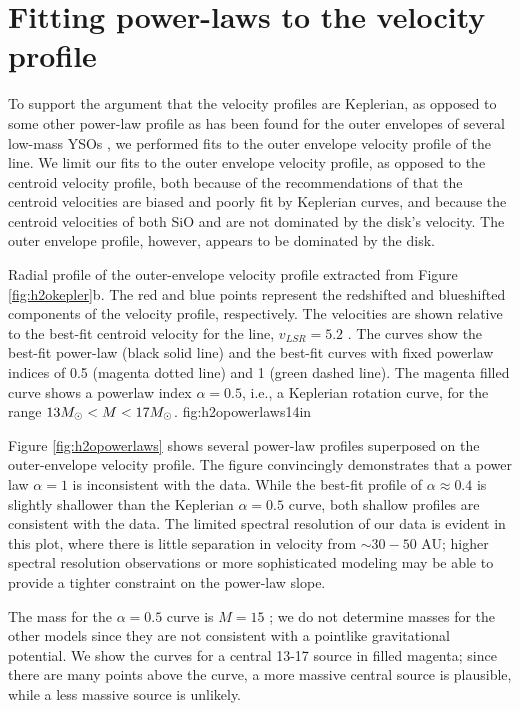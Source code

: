 \documentclass[twocolumn]{aastex61}
\begin{document}
\section{Fitting power-laws to the velocity profile}
To support the argument that the velocity profiles are Keplerian, as opposed to
some other power-law profile as has been found for the outer envelopes of
several low-mass YSOs
\citep{Lee2017h,Aso2017b,Ohashi2014a,Lindberg2014a,Murillo2013a}, we performed
fits to the outer envelope velocity profile of the \water line.  We limit our
fits to the outer envelope velocity profile, as opposed to the centroid
velocity profile, both because of the recommendations of \citet{Seifried2016a}
that the centroid velocities are biased and poorly fit by Keplerian curves, and
because the centroid velocities of both SiO and \water are not dominated by the
disk's velocity.  The outer envelope profile, however, appears to be dominated
by the disk.

{Radial profile of the outer-envelope velocity profile extracted from
Figure \ref{fig:h2okepler}b.  The red and blue points represent the redshifted
and blueshifted components of the velocity profile, respectively.  The velocities
are shown relative to the best-fit centroid velocity for the \water line,
$v_{LSR}=5.2$ \kms.  The curves show the best-fit power-law (black solid line)
and the best-fit curves with fixed powerlaw indices of 0.5 (magenta dotted line)
and 1 (green dashed line).  The magenta filled curve shows a powerlaw index
$\alpha=0.5$, i.e., a Keplerian rotation curve, for the range $13 M_{\odot} < M <
17 M_{\odot}$. }
{fig:h2opowerlaws}{1}{4in}

Figure \ref{fig:h2opowerlaws} shows several power-law profiles superposed on
the outer-envelope velocity profile.  The figure convincingly demonstrates that
a power law $\alpha=1$ \citep[e.g., as observed in the outer parts of low-mass
YSO disks;][]{Aso2017b} is inconsistent with the data.  While the best-fit
profile of $\alpha\approx0.4$ is slightly shallower than the Keplerian
$\alpha=0.5$ curve, both shallow profiles are consistent with the data.
The limited spectral resolution of our data is evident in this plot, where
there is little separation in velocity from $\sim30-50$ AU; higher
spectral resolution observations or more sophisticated modeling may be able to
provide a tighter constraint on the power-law slope.

The mass for the $\alpha=0.5$ curve is $M=15$ \msun; we do not determine
masses for the other models since they are not consistent with a pointlike
gravitational potential.  We show the curves for a central 13-17 \msun source
in filled magenta; since there are many points above the curve, a more massive
central source is plausible, while a less massive source is unlikely.
\end{document}
